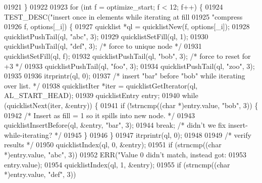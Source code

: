 \begin{DoxyCode}
{{{{{{{{{{{{{{{{{{{{{{{{{{{{{{{{{{{{{{{{{{{{{{{{{01921         \}
01922 
01923         \textcolor{keywordflow}{for} (\textcolor{keywordtype}{int} f = optimize\_start; f < 12; f++) \{
01924             TEST\_DESC(\textcolor{stringliteral}{"insert once in elements while iterating at fill %
01925                       \textcolor{stringliteral}{"compress %
01926                       f, options[\_i]) \{
01927                 quicklist *ql = quicklistNew(f, options[\_i]);
01928                 quicklistPushTail(ql, \textcolor{stringliteral}{"abc"}, 3);
01929                 quicklistSetFill(ql, 1);
01930                 quicklistPushTail(ql, \textcolor{stringliteral}{"def"}, 3); \textcolor{comment}{/* force to unique node */}
01931                 quicklistSetFill(ql, f);
01932                 quicklistPushTail(ql, \textcolor{stringliteral}{"bob"}, 3); \textcolor{comment}{/* force to reset for +3 */}
01933                 quicklistPushTail(ql, \textcolor{stringliteral}{"foo"}, 3);
01934                 quicklistPushTail(ql, \textcolor{stringliteral}{"zoo"}, 3);
01935 
01936                 itrprintr(ql, 0);
01937                 \textcolor{comment}{/* insert "bar" before "bob" while iterating over list. */}
01938                 quicklistIter *iter = quicklistGetIterator(ql, AL\_START\_HEAD);
01939                 quicklistEntry entry;
01940                 \textcolor{keywordflow}{while} (quicklistNext(iter, &entry)) \{
01941                     \textcolor{keywordflow}{if} (!strncmp((\textcolor{keywordtype}{char} *)entry.value, \textcolor{stringliteral}{"bob"}, 3)) \{
01942                         \textcolor{comment}{/* Insert as fill = 1 so it spills into new node. */}
01943                         quicklistInsertBefore(ql, &entry, \textcolor{stringliteral}{"bar"}, 3);
01944                         \textcolor{keywordflow}{break}; \textcolor{comment}{/* didn't we fix insert-while-iterating? */}
01945                     \}
01946                 \}
01947                 itrprintr(ql, 0);
01948 
01949                 \textcolor{comment}{/* verify results */}
01950                 quicklistIndex(ql, 0, &entry);
01951                 \textcolor{keywordflow}{if} (strncmp((\textcolor{keywordtype}{char} *)entry.value, \textcolor{stringliteral}{"abc"}, 3))
01952                     ERR(\textcolor{stringliteral}{"Value 0 didn't match, instead got: %
01953                         entry.value);
01954                 quicklistIndex(ql, 1, &entry);
01955                 \textcolor{keywordflow}{if} (strncmp((\textcolor{keywordtype}{char} *)entry.value, \textcolor{stringliteral}{"def"}, 3))
}}}}}}}}}}}}}}}}}}}}}}}}}}}}}}}}}}}}}}}}}}}}}}}}}}}}
\end{DoxyCode}

